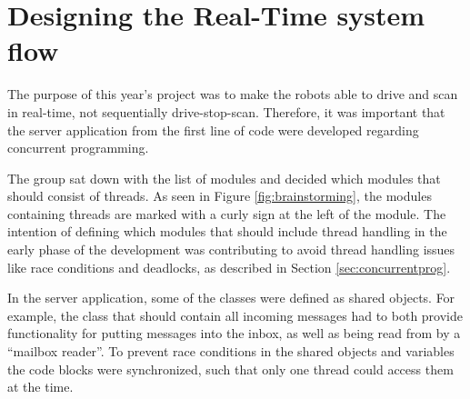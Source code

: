 \section{Designing the Real-Time system flow}
The purpose of this year's project was to make the robots able to drive and scan in real-time, not sequentially drive-stop-scan. Therefore, it was important that the server application from the first line of code were developed regarding concurrent programming.

The group sat down with the list of modules and decided which modules that should consist of threads. As seen in Figure \ref{fig:brainstorming}, the modules containing threads are marked with a curly sign at the left of the module. The intention of defining which modules that should include thread handling in the early phase of the development was contributing to avoid thread handling issues like race conditions and deadlocks, as described in Section \ref{sec:concurrentprog}.

In the server application, some of the classes were defined as shared objects. For example, the class that should contain all incoming messages had to both provide functionality for putting messages into the inbox, as well as being read from by a ``mailbox reader''. To prevent race conditions in the shared objects and variables the code blocks were synchronized, such that only one thread could access them at the time.